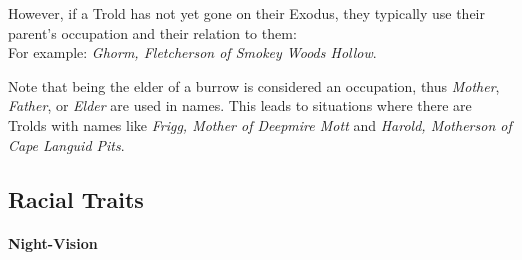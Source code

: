 However, if a Trold has not yet gone on their Exodus, they typically use their parent's occupation and their relation to them:\\
For example: \textit{Ghorm, Fletcherson of Smokey Woods Hollow}.

Note that being the elder of a burrow is considered an occupation, thus \textit{Mother}, \textit{Father}, or \textit{Elder} are used in names.
This leads to situations where there are Trolds with names like \textit{Frigg, Mother of Deepmire Mott} and \textit{Harold, Motherson of Cape Languid Pits}.

\subsection{Racial Traits}

\paragraph{Night-Vision}